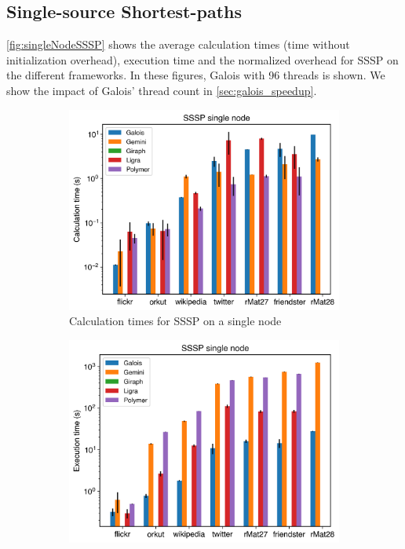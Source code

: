 \subsection{Single-source Shortest-paths}
\autoref{fig:singleNodeSSSP} shows the average calculation times (time without initialization overhead), execution time and the normalized overhead for SSSP on the different frameworks. In these figures, Galois with 96 threads is shown. We show the impact of Galois' thread count in \autoref{sec:galois_speedup}.
\begin{figure}[t!]
	\begin{subfigure}{0.3\textwidth}
		\includegraphics[width=\linewidth]{../../plots/singleNodeSSSP_calcTime.png}
		\caption{Calculation times for SSSP on a single node}
		\label{fig:singleNodeSSSP_calc}
	\end{subfigure}
	\hfil
	\begin{subfigure}{0.3\textwidth}
		\includegraphics[width=\linewidth]{../../plots/singleNodeSSSP_execTime.png}

\end{subfigure}
\end{figure}
